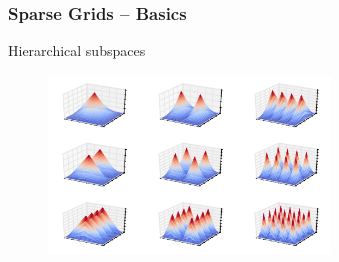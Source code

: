 \begin{frame}
  \frametitle{Sparse Grids -- Basics}
  \topline
  \vspace{-10px}
  \begin{block}{Hierarchical subspaces}
    \begin{figure}[!htp]
      \centering
      \includegraphics[width=7.5cm]{images/sparsegrid_2dhats}
      \vspace{-12px}
      \caption{}
    \end{figure}
  \end{block}
\end{frame}


